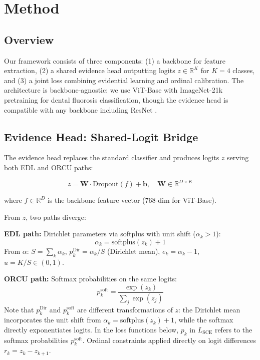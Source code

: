 \section{Method}

\subsection{Overview}

Our framework consists of three components: (1) a backbone for feature extraction, (2) a shared evidence head outputting logits $z \in \mathbb{R}^K$ for $K = 4$ classes, and (3) a joint loss combining evidential learning and ordinal calibration. The architecture is backbone-agnostic: we use ViT-Base \cite{dosovitskiy2020vit} with ImageNet-21k pretraining \cite{raghu2019transfusion} for dental fluorosis classification, though the evidence head is compatible with any backbone including ResNet \cite{he2016resnet}.

\subsection{Evidence Head: Shared-Logit Bridge}

The evidence head replaces the standard classifier and produces logits $z$ serving both EDL and ORCU paths:

\begin{equation}
    z = \mathbf{W} \cdot \text{Dropout}(f) + \mathbf{b}, \quad \mathbf{W} \in \mathbb{R}^{D \times K}
\end{equation}

where $f \in \mathbb{R}^D$ is the backbone feature vector (768-dim for ViT-Base).

From $z$, two paths diverge:

\textbf{EDL path:} Dirichlet parameters via softplus with unit shift ($\alpha_k > 1$):
\begin{equation}
    \alpha_k = \text{softplus}(z_k) + 1
\end{equation}
From $\alpha$: $S = \sum_k \alpha_k$, $p_k^{\text{Dir}} = \alpha_k / S$ (Dirichlet mean), $e_k = \alpha_k - 1$, $u = K / S \in (0, 1)$.

\textbf{ORCU path:} Softmax probabilities on the same logits:
\begin{equation}
    p_k^{\text{soft}} = \frac{\exp(z_k)}{\sum_j \exp(z_j)}
\end{equation}
Note that $p_k^{\text{Dir}}$ and $p_k^{\text{soft}}$ are different transformations of $z$: the Dirichlet mean incorporates the unit shift from $\alpha_k = \text{softplus}(z_k) + 1$, while the softmax directly exponentiates logits. In the loss functions below, $p_k$ in $L_{\text{SCE}}$ refers to the softmax probabilities $p_k^{\text{soft}}$.
Ordinal constraints applied directly on logit differences $r_k = z_k - z_{k+1}$.

